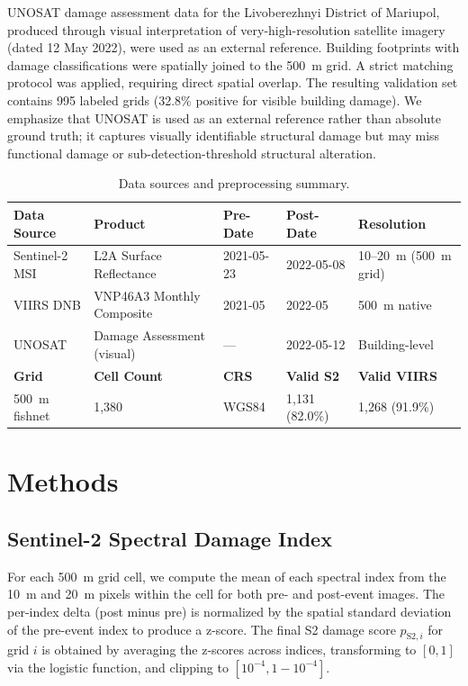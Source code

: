 \documentclass[wcp]{jmlr}
\begin{document}
UNOSAT damage assessment data for the Livoberezhnyi District of Mariupol,
produced through visual interpretation of very-high-resolution satellite
imagery (dated 12 May 2022), were used as an external reference. Building
footprints with damage classifications were spatially joined to the 500~m
grid. A strict matching protocol was applied, requiring direct spatial
overlap. The resulting validation set contains 995 labeled grids (32.8\%
positive for visible building damage). We emphasize that UNOSAT is used as
an external reference rather than absolute ground truth; it captures
visually identifiable structural damage but may miss functional damage or
sub-detection-threshold structural alteration.

\begin{table}[htp]
\centering
\caption{Data sources and preprocessing summary.}
\label{tab:data}
\begin{tabular}{@{}lllll@{}}
\toprule
\textbf{Data Source} & \textbf{Product} & \textbf{Pre-Date} & \textbf{Post-Date} & \textbf{Resolution} \\
\midrule
Sentinel-2 MSI  & L2A Surface Reflectance & 2021-05-23 & 2022-05-08 & 10--20~m (500~m grid) \\
VIIRS DNB       & VNP46A3 Monthly Composite & 2021-05 & 2022-05 & 500~m native \\
UNOSAT          & Damage Assessment (visual) & --- & 2022-05-12 & Building-level \\
\midrule
\textbf{Grid}   & \textbf{Cell Count} & \textbf{CRS} & \textbf{Valid S2} & \textbf{Valid VIIRS} \\
500~m fishnet   & 1{,}380              & WGS84       & 1{,}131 (82.0\%)  & 1{,}268 (91.9\%) \\
\bottomrule
\end{tabular}
\end{table}

\section{Methods}\label{sec:methods}

\subsection{Sentinel-2 Spectral Damage Index}

For each 500~m grid cell, we compute the mean of each spectral index from
the 10~m and 20~m pixels within the cell for both pre- and post-event
images. The per-index delta (post minus pre) is normalized by the spatial
standard deviation of the pre-event index to produce a z-score. The final S2
damage score $p_{\text{S2},i}$ for grid $i$ is obtained by averaging the
z-scores across indices, transforming to $[0,1]$ via the logistic function,
and clipping to $[10^{-4}, 1-10^{-4}]$.
\end{document}

